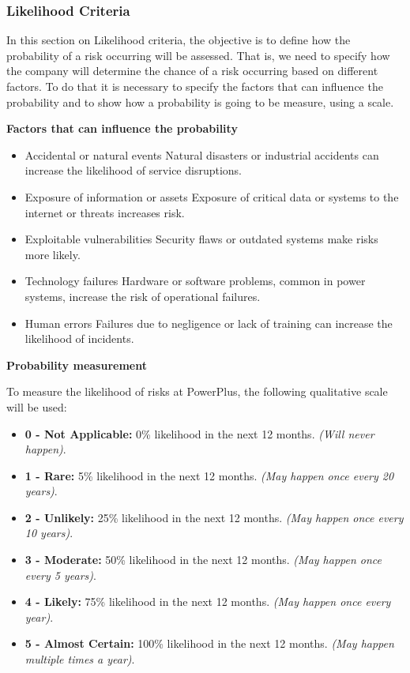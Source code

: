 \subsubsection{Likelihood Criteria}

In this section on Likelihood criteria, the objective is to define how the probability of a risk occurring will be assessed. That is, we need to specify how the company will determine the chance of a risk occurring based on different factors. To do that it is necessary to specify the factors that can influence the probability and to show how a probability is going to be measure, using a scale.

\textbf{Factors that can influence the probability}

\begin{itemize}
    \item Accidental or natural events \- Natural disasters or industrial accidents can increase the likelihood of service disruptions.
    \item Exposure of information or assets \- Exposure of critical data or systems to the internet or threats increases risk.
    \item Exploitable vulnerabilities \- Security flaws or outdated systems make risks more likely.
    \item Technology failures \- Hardware or software problems, common in power systems, increase the risk of operational failures.
    \item Human errors \- Failures due to negligence or lack of training can increase the likelihood of incidents.    
\end{itemize}

\textbf{Probability measurement}

To measure the likelihood of risks at PowerPlus, the following qualitative scale will be used:

\begin{itemize}
    \item \textbf{0 - Not Applicable:} 0\% likelihood in the next 12 months. \textit{(Will never happen)}.
    \item \textbf{1 - Rare:} 5\% likelihood in the next 12 months. \textit{(May happen once every 20 years)}.
    \item \textbf{2 - Unlikely:} 25\% likelihood in the next 12 months. \textit{(May happen once every 10 years)}.
    \item \textbf{3 - Moderate:} 50\% likelihood in the next 12 months. \textit{(May happen once every 5 years)}.
    \item \textbf{4 - Likely:} 75\% likelihood in the next 12 months. \textit{(May happen once every year)}.
    \item \textbf{5 - Almost Certain:} 100\% likelihood in the next 12 months. \textit{(May happen multiple times a year)}.
\end{itemize}

